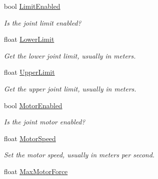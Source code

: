 \begin{DoxyCompactItemize}
bool \hyperlink{class_farseer_physics_1_1_dynamics_1_1_joints_1_1_prismatic_joint_ac898ef13b42fd543836c04bcd8f421d1}{Limit\+Enabled}
\begin{DoxyCompactList}\small\item\em Is the joint limit enabled? \end{DoxyCompactList}\item 
float \hyperlink{class_farseer_physics_1_1_dynamics_1_1_joints_1_1_prismatic_joint_abb2b4f312dd63ec73565d4074eedf1b3}{Lower\+Limit}
\begin{DoxyCompactList}\small\item\em Get the lower joint limit, usually in meters. \end{DoxyCompactList}\item 
float \hyperlink{class_farseer_physics_1_1_dynamics_1_1_joints_1_1_prismatic_joint_a80eb4690a1e1f5dd77706368f1ed0de5}{Upper\+Limit}
\begin{DoxyCompactList}\small\item\em Get the upper joint limit, usually in meters. \end{DoxyCompactList}\item 
bool \hyperlink{class_farseer_physics_1_1_dynamics_1_1_joints_1_1_prismatic_joint_a46e84f7405d6319bae6f56d7f0ad3ec2}{Motor\+Enabled}
\begin{DoxyCompactList}\small\item\em Is the joint motor enabled? \end{DoxyCompactList}\item 
float \hyperlink{class_farseer_physics_1_1_dynamics_1_1_joints_1_1_prismatic_joint_adf5459361569cddd36123b406627b791}{Motor\+Speed}
\begin{DoxyCompactList}\small\item\em Set the motor speed, usually in meters per second. \end{DoxyCompactList}\item 
float \hyperlink{class_farseer_physics_1_1_dynamics_1_1_joints_1_1_prismatic_joint_a2a6327304c4c09f52dc54b450db62506}{Max\+Motor\+Force}

\end{DoxyCompactItemize}
